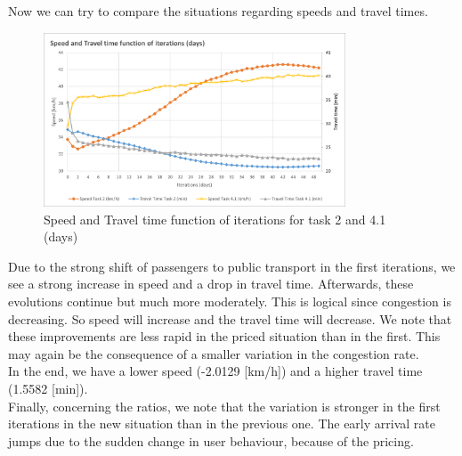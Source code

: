 \documentclass[a4paper, 12pt,oneside]{article}
\begin{document}
Now we can try to compare the situations regarding speeds and travel times.\\

\begin{figure}[H]
    \centering
    \includegraphics[width=0.8\textwidth]{Images/Step4/Speed_travel_time_function_iterations_comparaison_task_2_4.1.png}
    \caption{Speed and Travel time function of iterations for task 2 and 4.1 (days)}
    \label{fig:Speed and Travel time function of iterations for the task 2 and 4.1 (days)}
\end{figure}

Due to the strong shift of passengers to public transport in the first iterations, we see a strong increase in speed and a drop in travel time. Afterwards, these evolutions continue but much more moderately. This is logical since congestion is decreasing. So speed will increase and the travel time will decrease. We note that these improvements are less rapid in the priced situation than in the first. This may again be the consequence of a smaller variation in the congestion rate.\\

In the end, we have a lower speed (-2.0129 [km/h]) and a higher travel time (1.5582 [min]).\\

Finally, concerning the ratios, we note that the variation is stronger in the first iterations in the new situation than in the previous one. The early arrival rate jumps due to the sudden change in user behaviour, because of the pricing.\\
\end{document}
